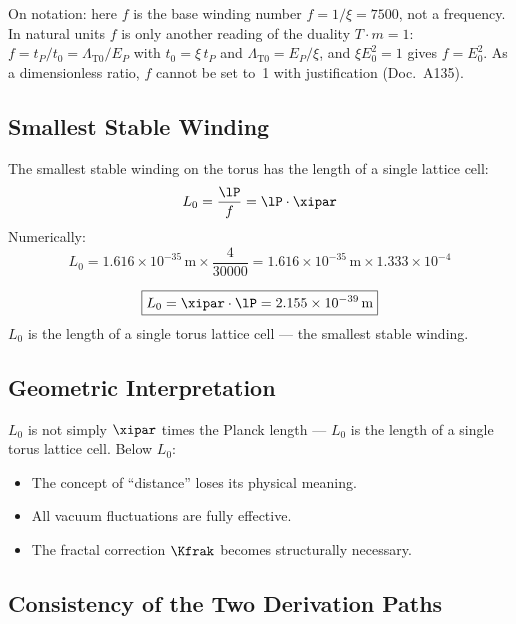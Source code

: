 On notation: here $f$ is the base winding number $f = 1/\xi = 7500$, not a frequency. In natural units $f$ is only another reading of the duality $T\cdot m = 1$: $f = t_P/t_0 = \Lambda_{\text{T0}}/E_P$ with $t_0 = \xi\,t_P$ and $\Lambda_{\text{T0}} = E_P/\xi$, and $\xi E_0^2 = 1$ gives $f = E_0^2$. As a dimensionless ratio, $f$ cannot be set to~1 with justification (Doc.~A135).

\subsection{Smallest Stable Winding}

The smallest stable winding on the torus has the length of a single lattice cell:
\begin{equation}
	L_0 = \frac{\lP}{f} = \lP \cdot \xipar
\end{equation}
Numerically:
\begin{equation}
	L_0 = 1{.}616 \times 10^{-35}\,\text{m} \times \frac{4}{30000} = 1{.}616 \times 10^{-35}\,\text{m} \times 1{.}333 \times 10^{-4}
\end{equation}

\begin{keyresult}
\begin{equation}
	\boxed{L_0 = \xipar \cdot \lP = 2{.}155 \times 10^{-39}\,\text{m}}
\end{equation}
$L_0$ is the length of a single torus lattice cell — the smallest stable winding.
\end{keyresult}

\subsection{Geometric Interpretation}

$L_0$ is not simply $\xipar$ times the Planck length — $L_0$ is the length of a single torus lattice cell. Below $L_0$:
\begin{itemize}
	\item The concept of ``distance'' loses its physical meaning.
	\item All vacuum fluctuations are fully effective.
	\item The fractal correction $\Kfrak$ becomes structurally necessary.
\end{itemize}

\subsection{Consistency of the Two Derivation Paths}

